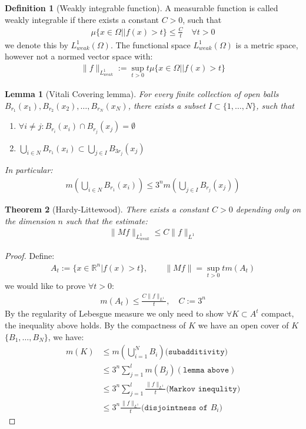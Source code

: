 \documentclass[a4paper,11pt,fleqn]{book}
\newtheorem{theorem}{Theorem}[section]
\newtheorem{lemma}[theorem]{Lemma}
\theoremstyle{definition}
\newtheorem{definition}{Definition}[section]
\theoremstyle{remark}
\begin{document}
\begin{definition}[Weakly integrable function]
	A measurable function is called weakly integrable if there exists a constant $C > 0$, such that
	\begin{align*}
		\mu\{ x \in \Omega| |f(x) > t\} \le \frac{C}{t} \quad \forall t >0
	\end{align*}
	we denote this by $L^1_{weak}(\Omega)$. The functional space $L^1_{weak}(\Omega)$ is a metric space, however not a normed vector space with:
	\begin{align*}
		\|f\|_{L^1_{weak}}:= \sup_{t >0} t\mu\{x \in \Omega| |f(x)>t\}
	\end{align*}
\end{definition}

\begin{lemma}[Vitali Covering lemma]
	For every finite collection of open balls $B_{r_1}(x_1), B_{r_2}(x_2), \dots, B_{r_N}(x_N)$, there exists a subset $I \subset \{1, \dots, N\}$, such that 
	\begin{enumerate}
		\item $\forall i \neq j: B_{r_i}(x_i) \cap B_{r_j}(x_j) = \emptyset$
		\item $\bigcup_{i \in N} B_{r_1}(x_i) \subset \bigcup_{j \in I} B_{3r_j}(x_j)$
	\end{enumerate} 
	In particular:
	\begin{align*}
		m(\bigcup_{i \in N} B_{r_1}(x_i)) \le 3^n m(\bigcup_{j \in I} B_{r_j}(x_j))
	\end{align*}
\end{lemma}

\begin{theorem}[Hardy-Littewood]
	There exists a constant $C > 0$ depending only on the dimension $n$ such that the estimate:
	\begin{align*}
		\|M f\|_{L^1_{weak}} \le C\|f\|_{L^1}
	\end{align*} 
\end{theorem}
\begin{proof}
Define:
\begin{align*}
	A_t:= \{x \in \mathbb{R}^n| f(x) > t\}, \qquad \|Mf\| = \sup_{t >0} t m(A_t)
\end{align*}
we would like to prove $\forall t > 0$:
\begin{align*}
	m(A_t) \le \frac{C\|f\|_{L^1}}{t}, \quad  C:= 3^n
\end{align*}
By the regularity of Lebesgue measure we only need to show $\forall K \subset A^t$ compact, the inequality above holds. By the compactness of $K$ we have an open cover of $K$ $\{B_1, \dots, B_N\}$, we have:
\begin{align*}
	m(K) &\le m(\bigcup_{i = 1}^N B_i)\texttt{(subadditivity)}\\
	&\le 3^n \sum_{j = 1}^l m(B_j) (\texttt{lemma above}) \\
	&\le 3^n \sum_{j = 1}^l \frac{\|f\|_{L^1}}{t}(\texttt{Markov inequlity)} \\
	&\le 3^n \frac{\|f\|_{L^1}}{t}(\texttt{disjointness of $B_i$)}
\end{align*}
\end{proof}
\end{document}
